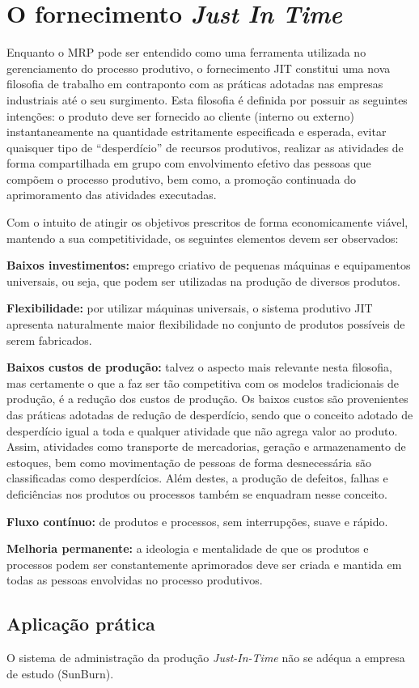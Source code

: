 \chapter{O fornecimento \textit{Just In Time}}
\label{chap:fornecimento_just_in_time}

Enquanto o \ac{MRP} pode ser entendido como uma ferramenta utilizada no gerenciamento do processo produtivo, o fornecimento \ac{JIT} constitui uma nova filosofia de trabalho em contraponto com as práticas adotadas nas empresas industriais até o seu surgimento. Esta filosofia é definida por possuir as seguintes intenções: o produto deve ser fornecido ao cliente (interno ou externo) instantaneamente na quantidade estritamente especificada e esperada, evitar quaisquer tipo de ``desperdício'' de recursos produtivos, realizar as atividades de forma compartilhada em grupo com envolvimento efetivo das pessoas que compõem o processo produtivo, bem como, a promoção continuada do aprimoramento das atividades executadas.

Com o intuito de atingir os objetivos prescritos de forma economicamente viável, mantendo a sua competitividade, os seguintes elementos devem ser observados:

\textbf{Baixos investimentos:} emprego criativo de pequenas máquinas e equipamentos universais, ou seja, que podem ser utilizadas na produção de diversos produtos.

\textbf{Flexibilidade:} por utilizar máquinas universais, o sistema produtivo \ac{JIT} apresenta naturalmente maior flexibilidade no conjunto de produtos possíveis de serem fabricados.

\textbf{Baixos custos de produção:} talvez o aspecto mais relevante nesta filosofia, mas certamente o que a faz ser tão competitiva com os modelos tradicionais de produção, é a redução dos custos de produção. Os baixos custos são provenientes das práticas adotadas de redução de desperdício, sendo que o conceito adotado de desperdício igual a toda e qualquer atividade que não agrega valor ao produto. Assim, atividades como transporte de mercadorias, geração e armazenamento de estoques, bem como movimentação de pessoas de forma desnecessária são classificadas como desperdícios. Além destes, a produção de defeitos, falhas e deficiências nos produtos ou processos também se enquadram nesse conceito.

\textbf{Fluxo contínuo:} de produtos e processos, sem interrupções, suave e rápido.

\textbf{Melhoria permanente:} a ideologia e mentalidade de que os produtos e processos podem ser constantemente aprimorados deve ser criada e mantida em todas as pessoas envolvidas no processo produtivos.

\section{Aplicação prática}
\label{sec:fonercimento_just_in_time_aplicacao}

O sistema de administração da produção \textit{Just-In-Time} não se adéqua a empresa de estudo (SunBurn). 
